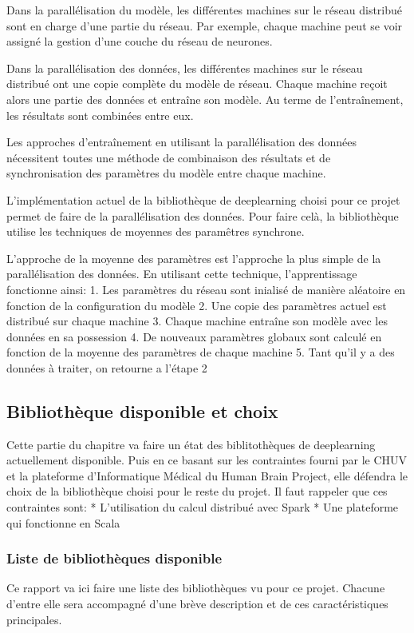 \documentclass[a4paper,10pt,openany,oneside]{sphinxmanual}
\begin{document}
Dans la parallélisation du modèle, les différentes machines sur le réseau distribué sont en charge d'une partie du réseau. Par exemple,
chaque machine peut se voir assigné la gestion d'une couche du réseau de neurones.

Dans la parallélisation des données, les différentes machines sur le réseau distribué ont une copie complète du modèle de réseau. Chaque
machine reçoit alors une partie des données et entraîne son modèle. Au terme de l'entraînement, les résultats sont combinées entre eux.

Les approches d'entraînement en utilisant la parallélisation des données nécessitent toutes une méthode de combinaison des résultats et de
synchronisation des paramètres du modèle entre chaque machine.

L'implémentation actuel de la bibliothèque de deeplearning choisi pour ce projet permet de faire de la parallélisation des données. Pour faire
celà, la bibliothèque utilise les techniques de moyennes des paramêtres synchrone.

L'approche de la moyenne des paramètres est l'approche la plus simple de la parallélisation des données. En utilisant cette technique,
l'apprentissage fonctionne ainsi:
1. Les paramètres du réseau sont inialisé de manière aléatoire en fonction de la configuration du modèle
2. Une copie des paramètres actuel est distribué sur chaque machine
3. Chaque machine entraîne son modèle avec les données en sa possession
4. De nouveaux paramètres globaux sont calculé en fonction de la moyenne des paramètres de chaque machine
5. Tant qu'il y a des données à traiter, on retourne a l'étape 2


\subsection{Bibliothèque disponible et choix}
\label{index:bibliotheque-disponible-et-choix}
Cette partie du chapitre va faire un état des biblitothèques de deeplearning actuellement disponible. Puis en ce basant sur les contraintes
fourni par le CHUV et la plateforme d'Informatique Médical du Human Brain Project, elle défendra le choix de la bibliothèque choisi pour le
reste du projet. Il faut rappeler que ces contraintes sont:
* L'utilisation du calcul distribué avec Spark
* Une plateforme qui fonctionne en Scala


\subsubsection{Liste de bibliothèques disponible}
\label{index:liste-de-bibliotheques-disponible}
Ce rapport va ici faire une liste des bibliothèques vu pour ce projet. Chacune d'entre elle sera accompagné d'une brève description et de
ces caractéristiques principales.
\end{document}
